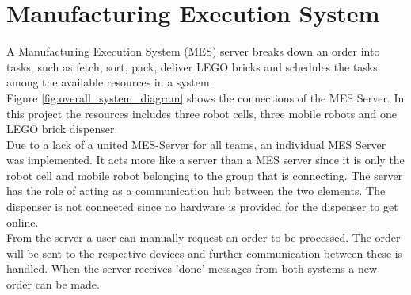 \chapter{Manufacturing Execution System}\label{chap:mes_server_chapter}

A Manufacturing Execution System (MES) server breaks down an order into tasks, such as fetch, sort, pack, deliver LEGO bricks and schedules the tasks among the available resources in a system. \\

Figure \ref{fig:overall_system_diagram} shows the connections of the MES Server. In this project the resources includes three robot cells, three mobile robots and one LEGO brick dispenser. \\

Due to a lack of a united MES-Server for all teams, an individual MES Server was implemented. It acts more like a server than a MES server since it is only the robot cell and mobile robot belonging to the group that is connecting. The server has the role of acting as a communication hub between the two elements. The dispenser is not connected since no hardware is provided for the dispenser to get online. \\

From the server a user can manually request an order to be processed. The order will be sent to the respective devices and further communication between these is handled. When the server receives 'done' messages from both systems a new order can be made.



%



